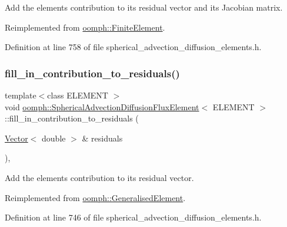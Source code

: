 Add the element\textquotesingle{}s contribution to its residual vector and its Jacobian matrix. 



Reimplemented from \hyperlink{classoomph_1_1FiniteElement_a0ae7af222af38a0d53bf283dc85bdfea}{oomph\+::\+Finite\+Element}.



Definition at line 758 of file spherical\+\_\+advection\+\_\+diffusion\+\_\+elements.\+h.

\mbox{\label{classoomph_1_1SphericalAdvectionDiffusionFluxElement_ac8579ca5c2ad606199559db1f971d13b}} 
\subsubsection{\texorpdfstring{fill\+\_\+in\+\_\+contribution\+\_\+to\+\_\+residuals()}{fill\_in\_contribution\_to\_residuals()}}
{\footnotesize\ttfamily template$<$class E\+L\+E\+M\+E\+NT $>$ \\
void \hyperlink{classoomph_1_1SphericalAdvectionDiffusionFluxElement}{oomph\+::\+Spherical\+Advection\+Diffusion\+Flux\+Element}$<$ E\+L\+E\+M\+E\+NT $>$\+::fill\+\_\+in\+\_\+contribution\+\_\+to\+\_\+residuals (\begin{DoxyParamCaption}\item[{\hyperlink{classoomph_1_1Vector}{Vector}$<$ double $>$ \&}]{residuals }\end{DoxyParamCaption})\hspace{0.3cm}{\ttfamily [inline]}, {\ttfamily [virtual]}}



Add the element\textquotesingle{}s contribution to its residual vector. 



Reimplemented from \hyperlink{classoomph_1_1GeneralisedElement_a310c97f515e8504a48179c0e72c550d7}{oomph\+::\+Generalised\+Element}.



Definition at line 746 of file spherical\+\_\+advection\+\_\+diffusion\+\_\+elements.\+h.



